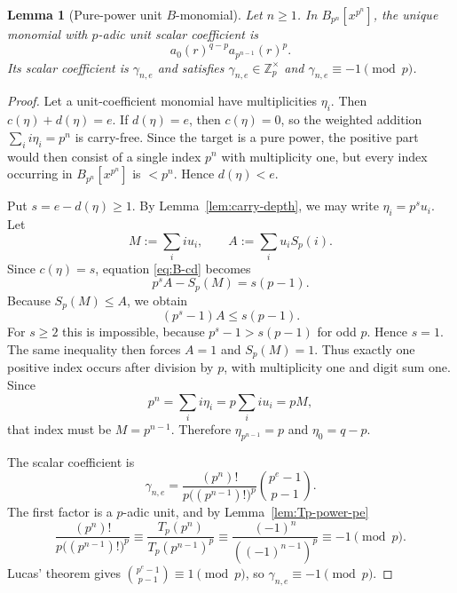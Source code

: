 \documentclass[11pt]{amsart}
\numberwithin{equation}{section}
\newtheorem{lemma}[lemma]{Lemma}
\newcommand{\Zp}{\mathbb{Z}_p}
\newcommand{\Sp}{S_p}
\newcommand{\Tp}{T_p}
\begin{document}
\begin{lemma}[Pure-power unit $B$-monomial]\label{lem:pure-power-B-unit}
Let $n\ge1$.  In $B_{p^n}[x^{p^n}]$, the unique monomial with $p$-adic unit scalar coefficient is
\[
        a_0(r)^{q-p}a_{p^{n-1}}(r)^p.
\]
Its scalar coefficient is $\gamma_{n,e}$ and satisfies $\gamma_{n,e}\in\Zp^\times$ and $\gamma_{n,e}\equiv-1\pmod p$.
\end{lemma}
\begin{proof}
Let a unit-coefficient monomial have multiplicities $\eta_i$.  Then $c(\eta)+d(\eta)=e$.  If $d(\eta)=e$, then $c(\eta)=0$, so the weighted addition $\sum_i i\eta_i=p^n$ is carry-free.  Since the target is a pure power, the positive part would then consist of a single index $p^n$ with multiplicity one, but every index occurring in $B_{p^n}[x^{p^n}]$ is $<p^n$.  Hence $d(\eta)<e$.

Put $s=e-d(\eta)\ge1$.  By Lemma~\ref{lem:carry-depth}, we may write $\eta_i=p^s u_i$.  Let
\[
        M:=\sum_i i u_i,
        \qquad
        A:=\sum_i u_i\Sp(i).
\]
Since $c(\eta)=s$, equation \eqref{eq:B-cd} becomes
\[
        p^sA-\Sp(M)=s(p-1).
\]
Because $\Sp(M)\le A$, we obtain
\[
        (p^s-1)A\le s(p-1).
\]
For $s\ge2$ this is impossible, because $p^s-1>s(p-1)$ for odd $p$.  Hence $s=1$.  The same inequality then forces $A=1$ and $\Sp(M)=1$.  Thus exactly one positive index occurs after division by $p$, with multiplicity one and digit sum one.  Since
\[
        p^n=\sum_i i\eta_i=p\sum_i i u_i=pM,
\]
that index must be $M=p^{n-1}$.  Therefore $\eta_{p^{n-1}}=p$ and $\eta_0=q-p$.

The scalar coefficient is
\[
        \gamma_{n,e}
        =\frac{(p^n)!}{p\bigl((p^{n-1})!\bigr)^p}\binom{p^e-1}{p-1}.
\]
The first factor is a $p$-adic unit, and by Lemma~\ref{lem:Tp-power-pe}
\[
        \frac{(p^n)!}{p\bigl((p^{n-1})!\bigr)^p}
        \equiv \frac{\Tp(p^n)}{\Tp(p^{n-1})^p}
        \equiv \frac{(-1)^n}{((-1)^{n-1})^p}
        \equiv -1\pmod p.
\]
Lucas' theorem gives $\binom{p^e-1}{p-1}\equiv1\pmod p$, so $\gamma_{n,e}\equiv-1\pmod p$.
\end{proof}
\end{document}
